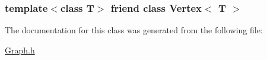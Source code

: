 \subsubsection[{Vertex$<$ T $>$}]{\setlength{\rightskip}{0pt plus 5cm}template$<$class T$>$ friend class {\bf Vertex}$<$ T $>$\hspace{0.3cm}{\ttfamily [friend]}}\label{class_edge_a2e120a12dec663fa334633b4f26cbed8}


The documentation for this class was generated from the following file\+:\begin{DoxyCompactItemize}
\item 
\hyperlink{_graph_8h}{Graph.\+h}\end{DoxyCompactItemize}
